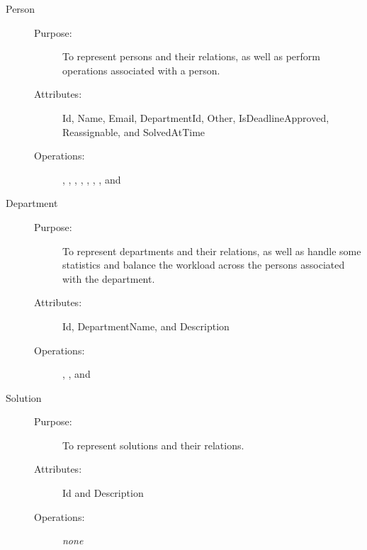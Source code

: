 \begin{description}
\item[Person]\hfill
\begin{description}
	\item[Purpose:]To represent persons and their relations, as well as perform operations associated with a person.
	\item[Attributes:]Id, Name, Email, DepartmentId, Other, IsDeadlineApproved, Reassignable, and SolvedAtTime
	\item[Operations:], , , , , , , and 
\end{description}
\end{description}

\begin{description}
\item[Department]\hfill
\begin{description}
	\item[Purpose:]To represent departments and their relations, as well as handle some statistics and balance the workload across the persons associated with the department.
	\item[Attributes:]Id, DepartmentName, and Description
	\item[Operations:], , and 
\end{description}
\end{description}

\begin{description}
\item[Solution]\hfill
\begin{description}
	\item[Purpose:]To represent solutions and their relations.
	\item[Attributes:]Id and Description
	\item[Operations:]\textit{none}
\end{description}
\end{description}

